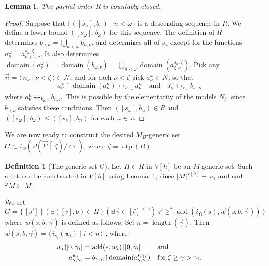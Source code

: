 \documentclass[
twoside,
]{article}
\newtheorem{lemma}[theorem]{Lemma}
\theoremstyle{definition}
\newtheorem{definition}[theorem]{Definition}
\theoremstyle{remark}
\DeclareMathOperator{\add}{add}
\DeclareMathOperator{\otp}{otp}
\newcommand{\ords}{\Omega}
\newcommand\gkeq{\leftrightarrow}
\newcommand\mgkeq{/{\gkeq}}
\DeclareMathOperator{\len}{length}
\newcommand{\set}[1]{\{\,#1\,\}}
\newcommand{\pair}[1]{\langle#1\rangle}
\newcommand{\seq}[1]{\pair{\,#1\,}}
\newcommand{\card}[1]{|#1|}
\newcommand{\restrict}{{\upharpoonright}}
\DeclareMathOperator{\domain}{domain}
\begin{document}
  \begin{lemma}\label{thm:Rcomplete}
    The partial order $R$ is countably closed.
  \end{lemma}

  \begin{proof}
    Suppose that $\seq{([s_n], b_n)\mid n<\omega}$ is a descending
    sequence in $R$.  We define a lower bound
    $([s_{\omega}],b_{\omega})$ for this sequence.  The definition of $R$ determines 
    $b_{\omega,\nu}=\bigcup_{n<\omega}b_{n,\nu}$, and determines all of 
    $s_{\omega}$  except for the functions $a^\omega_\nu=a^{s_{\omega},\zeta}_{\nu+1,\nu}$.
    It also determines  $\domain(a^\omega_\nu)=
    \domain(b_{\omega,\nu})= \bigcup_{n<\omega}\domain(a^{s_n,\zeta}_{\zeta,\nu})$. 
    Pick any  $\vec n=\seq{n_\nu\mid\nu<\zeta}\in\mathcal{N}$, and for each
    $\nu<\zeta$ pick $a^\omega_\nu\in N_\nu$ so that
    \begin{equation*}
      a^\omega_\nu\restrict\domain(a^n_\nu)\gkeq_{k_{n,\nu}}a^n_\nu
      \quad\text{and}\quad 
      a^\omega_\nu\gkeq_{n_{\nu}}b_{\omega,\nu}
    \end{equation*}
    where $a^n_\nu\gkeq_{k_{n,\nu}} b_{n,\nu}$.  This
    is possible by the elementarity of the models $N_{\xi}$, since
    $b_{\omega,\nu}$ satisfies these conditions.    Then
    $([s_{\omega}],b_{\omega})\in R$ and
    $([s_{\omega}],b_{\omega})\le ([s_{n}],b_{n})$ for each $n\in\omega$.
  \end{proof}
  
  We are now ready to construct the desired $M_B$-generic set 
  $G\subset i_{\ords}(P(\vec E\restrict\zeta)\mgkeq)$, where $\zeta=\otp(B)$.
    
  \begin{definition}[The generic set $G$]
    \label{def:G}
    Let  $H\subset R$ in $V[h]$ be an
    $M$-generic set.   Such a set can be constructed in $V[h]$ using 
    Lemma~\ref{thm:Rcomplete},  since   $\card M^{V[h]}=\omega_1$ and
    and $^{\omega}M\subseteq   M$. 
    
    We set
    \begin{equation}\label{eq:a1}
      G=\set{[s']\mid (\exists
      ([s],b)\in H)(\exists\vec \gamma\in[\zeta]^{<\omega} )\, 
      s'\geq^* \add(i_{\ords}(s),\vec w(s,b,\vec\gamma))}
  \end{equation}
  where  $\vec w(s,b,\vec \gamma)$ is defined as follows: Set
  $n=\len(\vec\gamma)$.   Then 
  $\vec w(s,b,\vec\gamma)=\seq{i_{\gamma_i}(w_i)\mid  i<n}$ , where 
  \begin{align}
    w_i\restrict[0,\gamma_i]&=\add(s,w_i)\restrict[0,\gamma_i]
    && \text{and}\notag\\ 
    a^{w_i}_{\gamma,\gamma_i}&=
                               b_{\gamma,\gamma_i}\restrict\domain(a^{s,\gamma_i}_{\gamma,\gamma_i})&
                             &\text{for $\zeta\geq\gamma>\gamma_i$.}
                               \label{eq:a2}
  \end{align}
  \end{definition}
\end{document}
